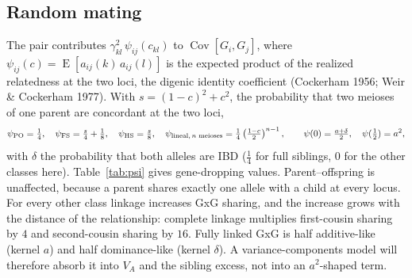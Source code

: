 \documentclass[11pt]{article}
\newcommand{\Cov}{\operatorname{Cov}}
\newcommand{\E}{\operatorname{E}}
\begin{document}
\subsection{Random mating}
The pair contributes $\gamma_{kl}^2\,\psi_{ij}(c_{kl})$ to $\Cov[G_i,G_j]$, where
$\psi_{ij}(c)=\E[a_{ij}(k)\,a_{ij}(l)]$ is the expected product of the realized relatedness at the two loci,
the digenic identity coefficient (Cockerham 1956; Weir \& Cockerham 1977). With
$s=(1-c)^2+c^2$, the probability that two meioses of one parent are concordant at the two loci,
\[
\psi_{\rm PO}=\tfrac14,\quad \psi_{\rm FS}=\tfrac{s}{4}+\tfrac18,\quad \psi_{\rm HS}=\tfrac{s}{8},\quad
\psi_{\text{lineal},\,n\text{ meioses}}=\tfrac14\left(\tfrac{1-c}{2}\right)^{n-1},\qquad
\psi(0)=\tfrac{a+\delta}{2},\quad \psi(\tfrac12)=a^2 ,
\]
with $\delta$ the probability that both alleles are IBD ($\frac14$ for full siblings, $0$ for the other
classes here). Table~\ref{tab:psi} gives gene-dropping values. Parent--offspring is unaffected, because a parent shares exactly
one allele with a child at every locus. For every other class linkage increases GxG sharing, and the
increase grows with the distance of the relationship: complete linkage multiplies first-cousin sharing by $4$
and second-cousin sharing by $16$. Fully linked GxG is half additive-like (kernel $a$) and half
dominance-like (kernel $\delta$). A variance-components model will therefore absorb it into $V_A$ and the
sibling excess, not into an $a^2$-shaped term.

\begin{table}[h]\centering\small
\caption{Random-mating GxG kernel $\psi(c)$ for a pair of loci at recombination fraction $c$ (gene
dropping, $4\times10^5$ draws; agrees with the closed forms above to $\pm0.0005$).}\label{tab:psi}

\end{table}
\end{document}
